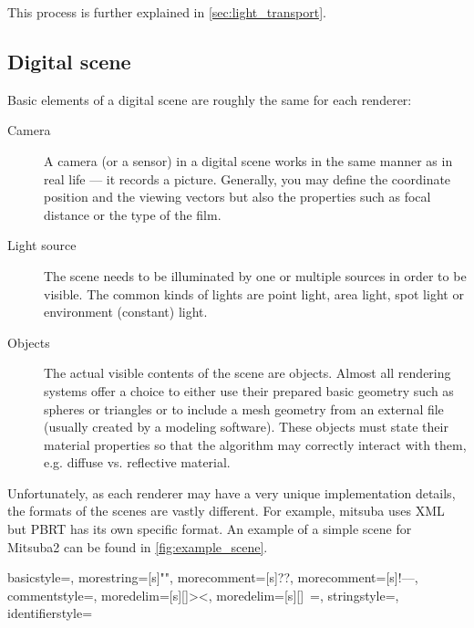 This process is further explained in \autoref{sec:light_transport}.

\subsection{Digital scene}

Basic elements of a digital scene are roughly the same for each renderer:

\begin{description}
	\item[Camera] A camera (or a sensor) in a digital scene works in the same manner as in real life --- it records a picture. Generally, you may define the coordinate position and the viewing vectors but also the properties such as focal distance or the type of the film.
	\item[Light source] The scene needs to be illuminated by one or multiple sources in order to be visible. The common kinds of lights are point light, area light, spot light or environment (constant) light. 
	\item[Objects] The actual visible contents of the scene are objects. Almost all rendering systems offer a choice to either use their prepared basic geometry such as spheres or triangles or to include a mesh geometry from an external file (usually created by a modeling software). These objects must state their material properties so that the algorithm may correctly interact with them, e.g. diffuse vs. reflective material.
\end{description}

Unfortunately, as each renderer may have a very unique implementation details, the formats of the scenes are vastly different. For example, mitsuba uses XML but PBRT has its own specific format. An example of a simple scene for Mitsuba2 can be found in \autoref{fig:example_scene}.

{
	basicstyle=\ttfamily,
	morestring=[s]{"}{"},
	morecomment=[s]{?}{?},
	morecomment=[s]{!--}{--},
	commentstyle=\color{darkgreen},
	moredelim=[s][\color{black}]{>}{<},
	moredelim=[s][\color{red}]{\ }{=},
	stringstyle=\color{blue},
	identifierstyle=\color{maroon}
}

